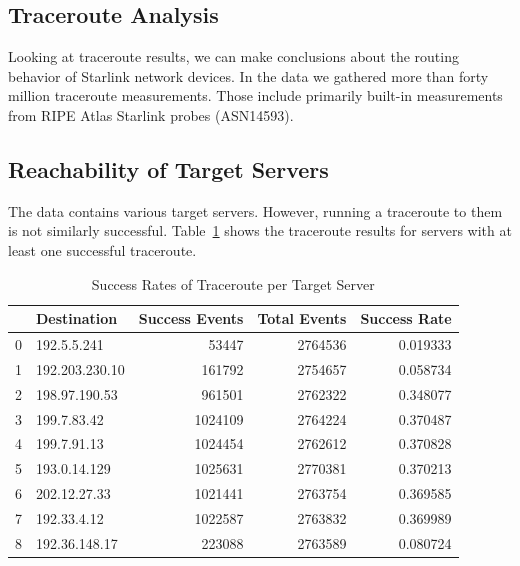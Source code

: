 
\subsection{Traceroute Analysis} \label{sec:traceroute-analysis}

Looking at traceroute results, we can make conclusions about the routing
behavior of Starlink network devices. In the data we gathered more than forty
million traceroute measurements. Those include primarily built-in measurements
from RIPE Atlas Starlink probes (ASN14593).

\subsection*{Reachability of Target Servers}

The data contains various target servers. However, running a traceroute to them
is not similarly successful. Table~\ref{fig:traceroute-success-rates} shows the
traceroute results for servers with at least one successful traceroute.

\begin{table}
	\footnotesize
	\caption{Success Rates of Traceroute per Target Server}
	\label{fig:traceroute-success-rates}
	\begin{tabular}{llrrr}
		\toprule
		  & Destination    & Success Events & Total Events & Success Rate \\
		\midrule
		0 & 192.5.5.241    & 53447          & 2764536      & 0.019333     \\
		1 & 192.203.230.10 & 161792         & 2754657      & 0.058734     \\
		2 & 198.97.190.53  & 961501         & 2762322      & 0.348077     \\
		3 & 199.7.83.42    & 1024109        & 2764224      & 0.370487     \\
		4 & 199.7.91.13    & 1024454        & 2762612      & 0.370828     \\
		5 & 193.0.14.129   & 1025631        & 2770381      & 0.370213     \\
		6 & 202.12.27.33   & 1021441        & 2763754      & 0.369585     \\
		7 & 192.33.4.12    & 1022587        & 2763832      & 0.369989     \\
		8 & 192.36.148.17  & 223088         & 2763589      & 0.080724     \\
		\bottomrule
	\end{tabular}
\end{table}

